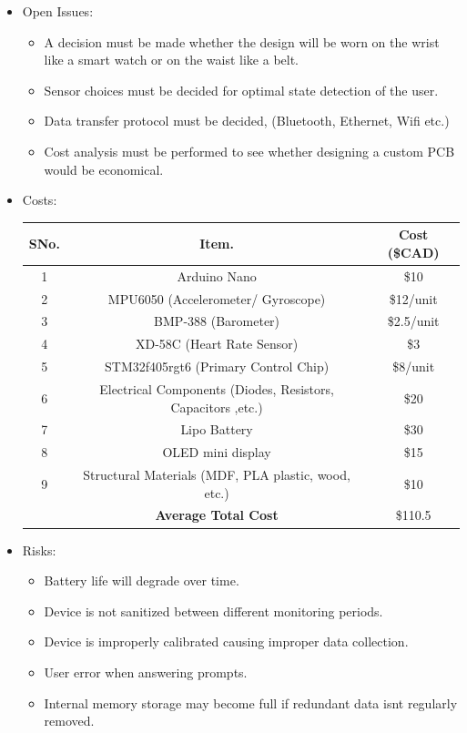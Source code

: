 \documentclass[12pt]{article}
\begin{document}
\begin{itemize}
\item Open Issues:
	\begin{itemize}
		\item A decision must be made whether the design will be worn on the wrist like a smart watch or on the waist like a belt.
		\item Sensor choices must be decided for optimal state detection of the user.
		\item Data transfer protocol must be decided, (Bluetooth, Ethernet, Wifi etc.)
		\item Cost analysis must be performed to see whether designing a custom PCB would be economical.
	\end{itemize}
	

\item Costs:
		\begin{center}
			\begin{tabular}{ |c|c|c| } 
				 \hline
				 	\textbf{SNo.} &  \textbf{Item.} &  \textbf{Cost (\$CAD)} \\ 
				 \hline
				 	1 & Arduino Nano 											& \$10 \\ 
				 \hline		
				 	2 & MPU6050 (Accelerometer/ Gyroscope)						& \$12/unit \\ 
				 \hline
				 	3 & BMP-388 (Barometer) 									& \$2.5/unit \\ 
				 \hline
				 	4 & XD-58C (Heart Rate Sensor)								& \$3\\ 
				 \hline
				 	5 & STM32f405rgt6 (Primary Control Chip) 						& \$8/unit \\ 
				 \hline
				 	6 & Electrical Components (Diodes, Resistors, Capacitors ,etc.) 		& \$20 \\ 
				 \hline
				 	7 & Lipo Battery 											& \$30 \\ 
				 \hline
				 	8 &OLED mini display										& \$15 \\ 
				 \hline
				 	9 & Structural Materials (MDF, PLA plastic, wood, etc.) 			& \$10 \\ 
				 \hline
				 	& \textbf{Average Total Cost}								& \$110.5 \\ 
				 \hline
			\end{tabular}
		\end{center}

\item Risks:
	\begin{itemize}
		\item Battery life will degrade over time.
		\item Device is not sanitized between different monitoring periods.
		\item Device is improperly calibrated causing improper data collection.
		\item User error when answering prompts.
		\item Internal memory storage may become full if redundant data isnt regularly removed.
	\end{itemize}


\end{itemize}
\end{document}
